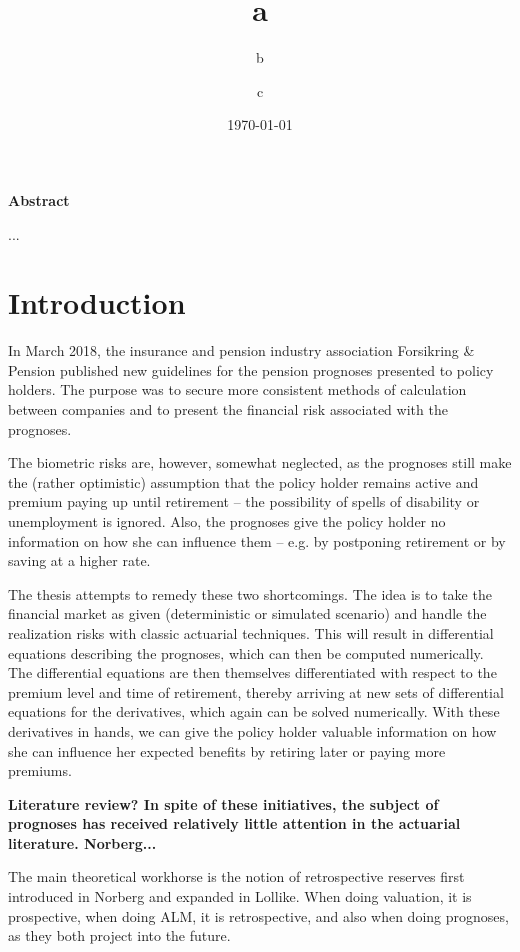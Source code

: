 \documentclass{book}
\title{a}
\subtitle{b}
\author{c}
\date{\today}
\newcommand{\1}[1]{\mathbbm{1}_{\left\lbrace #1 \right\rbrace}}
\theoremstyle{break}
\theoremstyle{remark}
\numberwithin{equation}{section}
\begin{document}
\maketitle

\textbf{Abstract}

...

\newpage

\tableofcontents

\newpage

\chapter{Introduction}

In March 2018, the insurance and pension industry association Forsikring \& Pension published new guidelines for the pension prognoses presented to policy holders. The purpose was to secure more consistent methods of calculation between companies and to present the financial risk associated with the prognoses.

The biometric risks are, however, somewhat neglected, as the prognoses still make the (rather optimistic) assumption that the policy holder remains active and premium paying up until retirement -- the possibility of spells of disability or unemployment is ignored. Also, the prognoses give the policy holder no information on how she can influence them -- e.g. by postponing retirement or by saving at a higher rate.

The thesis attempts to remedy these two shortcomings. The idea is to take the financial market as given (deterministic or simulated scenario) and handle the realization risks with classic actuarial techniques. This will result in differential equations describing the prognoses, which can then be computed numerically. The differential equations are then themselves differentiated with respect to the premium level and time of retirement, thereby arriving at new sets of differential equations for the derivatives, which again can be solved numerically. With these derivatives in hands, we can give the policy holder valuable information on how she can influence her expected benefits by retiring later or paying more premiums.

\textbf{Literature review? In spite of these initiatives, the subject of prognoses has received relatively little attention in the actuarial literature. Norberg...}

The main theoretical workhorse is the notion of retrospective reserves first introduced in Norberg and expanded in Lollike. When doing valuation, it is prospective, when doing ALM, it is retrospective, and also when doing prognoses, as they both project into the future.
\end{document}
